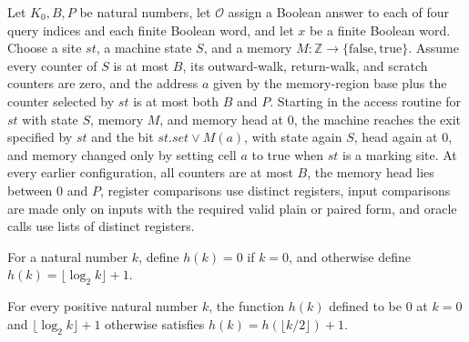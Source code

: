 \begin{theorem}
\label{Complexity.LogProg.ExpBFS.ac_run}
\leanok
{}
Let $K_0,B,P$ be natural numbers, let $\mathcal O$ assign a Boolean answer to each of
four query indices and each finite Boolean word, and let $x$ be a finite Boolean word.
Choose a site $st$, a machine state $S$, and a memory $M\colon\mathbb
Z\to\{\mathrm{false},\mathrm{true}\}$. Assume every counter of $S$ is at most $B$, its
outward-walk, return-walk, and scratch counters are zero, and the address $a$ given by
the memory-region base plus the counter selected by $st$ is at most both $B$ and $P$.
Starting in the access routine for $st$ with state $S$, memory $M$, and memory head at
$0$, the machine reaches the exit specified by $st$ and the bit $st.set\lor M(a)$, with
state again $S$, head again at $0$, and memory changed only by setting cell $a$ to true
when $st$ is a marking site. At every earlier configuration, all counters are at most
$B$, the memory head lies between $0$ and $P$, register comparisons use distinct
registers, input comparisons are made only on inputs with the required valid plain or
paired form, and oracle calls use lists of distinct registers.
\end{theorem}

\begin{definition}
\label{Complexity.LogProg.ExpBFS.hv}
\leanok
For a natural number $k$, define $h(k)=0$ if $k=0$, and otherwise define
$h(k)=\lfloor\log_2 k\rfloor+1$.
\end{definition}

\begin{lemma}
\label{Complexity.LogProg.ExpBFS.hv_div}
\leanok
{}
For every positive natural number $k$, the function $h(k)$ defined to be $0$ at $k=0$
and $\lfloor\log_2 k\rfloor+1$ otherwise satisfies $h(k)=h(\lfloor k/2\rfloor)+1$.
\end{lemma}

